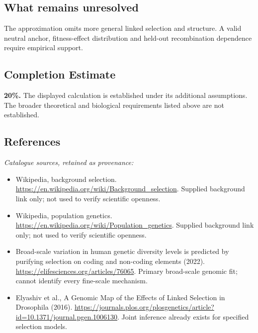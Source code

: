 \documentclass[11pt]{article}
\begin{document}
\subsection{What remains unresolved}
The approximation omits more general linked selection and structure. A valid neutral anchor, fitness-effect distribution and held-out recombination dependence require empirical support.
\subsection{Completion Estimate}
\textbf{20\%.} The displayed calculation is established under its additional assumptions. The broader theoretical and biological requirements listed above are not established.
\subsection{References}
\noindent\emph{Catalogue sources, retained as provenance:}
\begin{itemize}
\item Wikipedia, background selection. \url{https://en.wikipedia.org/wiki/Background_selection}. Supplied background link only; not used to verify scientific openness.
\item Wikipedia, population genetics. \url{https://en.wikipedia.org/wiki/Population_genetics}. Supplied background link only; not used to verify scientific openness.
\item Broad-scale variation in human genetic diversity levels is predicted by purifying selection on coding and non-coding elements (2022). \url{https://elifesciences.org/articles/76065}. Primary broad-scale genomic fit; cannot identify every fine-scale mechanism.
\item Elyashiv et al., A Genomic Map of the Effects of Linked Selection in Drosophila (2016). \url{https://journals.plos.org/plosgenetics/article?id=10.1371/journal.pgen.1006130}. Joint inference already exists for specified selection models.
\end{itemize}
\clearpage


\appendix
\end{document}
